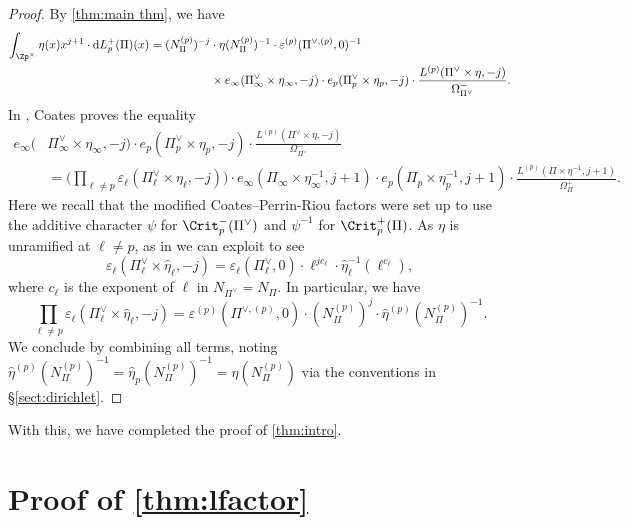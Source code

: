 \documentclass[10pt,reqno,a4paper]{amsart}
\begin{document}
 \begin{proof}
 	By \cref{thm:main thm}, we have
 	\begin{align*}
 		\int_{\Zp^\times} \eta(x)x^{j+1} \cdot \mathrm{d}L_p^+(\Pi)(x) = (N_{\Pi}^{(p)})^{-j}&\cdot \eta(N_{\Pi}^{(p)})^{-1} \cdot \varepsilon^{(p)}(\Pi^{\vee,(p)},0)^{-1}\\
 		&\times e_\infty(\Pi_\infty^\vee \times \eta_\infty, -j)\cdot e_p(\Pi^\vee_p \times \eta_p,-j)\cdot \frac{L^{(p)}(\Pi^\vee\times\eta,-j)}{\Omega_{\Pi^\vee}^-}.
 	\end{align*}
 	In \cite[(20)]{coates89}, Coates proves the equality
 	\begin{align*}
 	 e_\infty(&\Pi_\infty^\vee \times \eta_\infty,-j) \cdot e_p(\Pi^\vee_p \times \eta_p, -j)\cdot \frac{L^{(p)}(\Pi^\vee\times\eta,-j)}{\Omega_{\Pi^\vee}^-}\\
 	 &=\Big(\prod_{\ell \neq p} \varepsilon_\ell(\Pi_\ell^\vee\times \eta_\ell,-j)\Big) \cdot 	e_\infty(\Pi_\infty \times \eta_\infty^{-1}, j+1)\cdot e_p(\Pi_p \times \eta_p^{-1},j + 1)\cdot \frac{L^{(p)}(\Pi\times\eta^{-1},j+1)}{\Omega_{\Pi}^+}.
 	\end{align*}
 	Here we recall that the modified Coates--Perrin-Riou factors were set up to use the additive character $\psi$ for $\Crit^-_p(\Pi^\vee)$ and $\psi^{-1}$ for $\Crit^+_p(\Pi)$. As $\eta$ is unramified at $\ell \neq p$, as in \cite{coates89} we can exploit \cite[(3.4.6)]{Tat79} to see
 	\[
 	 \varepsilon_\ell(\Pi_\ell^\vee\times \widehat{\eta}_\ell,-j) = \varepsilon_\ell(\Pi_\ell^\vee,0) \cdot \ell^{jc_\ell}\cdot \widehat{\eta}_\ell^{-1}(\ell^{c_\ell}),
 	\]
 	where $c_\ell$ is the exponent of $\ell$ in $N_{\Pi^\vee} = N_{\Pi}$. In particular, we have
 	\[
 	 \prod_{\ell \neq p} \varepsilon_\ell(\Pi_\ell^\vee\times \widehat{\eta}_\ell,-j) = \varepsilon^{(p)}(\Pi^{\vee,(p)},0) \cdot  (N_\Pi^{(p)})^j \cdot \widehat{\eta}^{(p)}(N_\Pi^{(p)})^{-1}.
 	\]
 	We conclude by combining all terms, noting $\hat\eta^{(p)}(N_\Pi^{(p)})^{-1} = \widehat{\eta}_p(N_\Pi^{(p)})^{-1} = \eta(N_\Pi^{(p)})$ via the conventions in \S\ref{sect:dirichlet}.
 \end{proof}
 
 With this, we have completed the proof of \cref{thm:intro}.



\appendix
\normalsize
\section{Proof of \texorpdfstring{\cref{thm:lfactor}}{\cref*{thm:lfactor}}}
\end{document}
